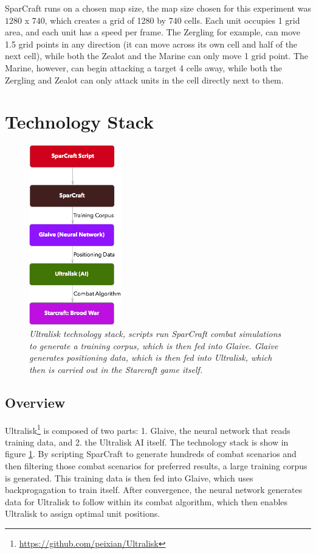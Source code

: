 \documentclass[twocolumn]{article}
\begin{document}
SparCraft runs on a chosen map size, the map size chosen for this experiment was $1280$ x $740$, which creates a grid of 1280 by 740 cells. Each unit occupies 1 grid area, and each unit has a speed per frame. The Zergling for example, can move 1.5 grid points in any direction (it can move across its own cell and half of the next cell), while both the Zealot and the Marine can only move 1 grid point. The Marine, however, can begin attacking a target 4 cells away, while both the Zergling and Zealot can only attack units in the cell directly next to them. 

\section{Technology Stack}
\begin{figure}[ht]
	\begin{center}
		\includegraphics[width=4cm]{techStack.png}
	\end{center}
	\caption{\textit{Ultralisk technology stack, scripts run SparCraft combat simulations to generate a training corpus, which is then fed into Glaive. Glaive generates positioning data, which is then fed into Ultralisk, which then is carried out in the Starcraft game itself. }}
	\label{fig:techStack}
\end{figure}

\subsection{Overview}
Ultralisk\footnote{\tiny{\url{https://github.com/peixian/Ultralisk}}} is composed of two parts: 1. Glaive, the neural network that reads training data, and 2. the Ultralisk AI itself. The technology stack is show in figure \ref{fig:techStack}. By scripting SparCraft to generate hundreds of combat scenarios and then filtering those combat scenarios for preferred results, a large training corpus is generated. This training data is then fed into Glaive, which uses backprogagation to train itself. After convergence, the neural network generates data for Ultralisk to follow within its combat algorithm, which then enables Ultralisk to assign optimal unit positions. 
\end{document}
